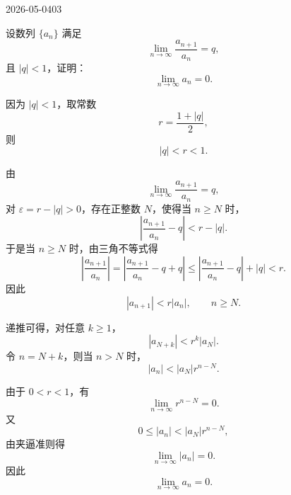 \begin{mistake}{2026-05-04}{03}

\begin{problemcontent}
设数列 \(\{a_n\}\) 满足
\[
\lim_{n\to\infty}\frac{a_{n+1}}{a_n}=q,
\]
且 \(|q|<1\)，证明：
\[
\lim_{n\to\infty}a_n=0.
\]
\end{problemcontent}

\begin{solutioncontent}
因为 \(|q|<1\)，取常数
\[
r=\frac{1+|q|}{2},
\]
则
\[
|q|<r<1.
\]

由
\[
\lim_{n\to\infty}\frac{a_{n+1}}{a_n}=q,
\]
对 \(\varepsilon=r-|q|>0\)，存在正整数 \(N\)，使得当 \(n\ge N\) 时，
\[
\left|\frac{a_{n+1}}{a_n}-q\right|<r-|q|.
\]
于是当 \(n\ge N\) 时，由三角不等式得
\[
\left|\frac{a_{n+1}}{a_n}\right|
=\left|\frac{a_{n+1}}{a_n}-q+q\right|
\le \left|\frac{a_{n+1}}{a_n}-q\right|+|q|
<r.
\]
因此
\[
|a_{n+1}|<r|a_n|,\qquad n\ge N.
\]

递推可得，对任意 \(k\ge 1\)，
\[
|a_{N+k}|<r^k|a_N|.
\]
令 \(n=N+k\)，则当 \(n>N\) 时，
\[
|a_n|<|a_N|r^{n-N}.
\]

由于 \(0<r<1\)，有
\[
\lim_{n\to\infty}r^{n-N}=0.
\]
又
\[
0\le |a_n|<|a_N|r^{n-N},
\]
由夹逼准则得
\[
\lim_{n\to\infty}|a_n|=0.
\]
因此
\[
\lim_{n\to\infty}a_n=0.
\]
\end{solutioncontent}


\end{mistake}
